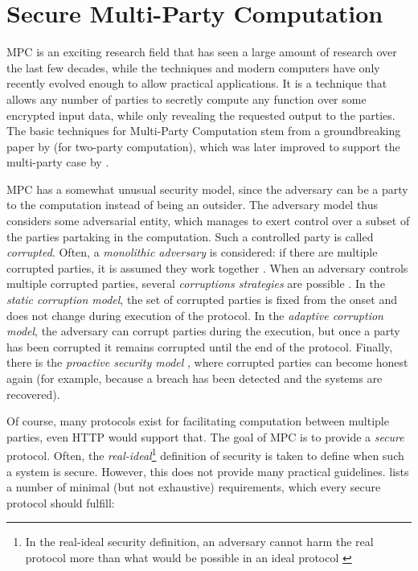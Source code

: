 \section{Secure Multi-Party Computation}
\label{sec:mpc}
\gls{MPC} is an exciting research field that has seen a large amount of research over the last few decades, while the techniques and modern computers have only recently evolved enough to allow practical applications. It is a technique that allows any number of parties to secretly compute any function over some encrypted input data, while only revealing the requested output to the parties. The basic techniques for Multi-Party Computation stem from a groundbreaking paper by \citet{yao} (for two-party computation), which was later improved to support the multi-party case by \citet{mpc}.

\gls{MPC} has a somewhat unusual security model, since the adversary can be a party to the computation instead of being an outsider. The adversary model thus considers some adversarial entity, which manages to exert control over a subset of the parties partaking in the computation. Such a controlled party is called \textit{corrupted}. Often, a \textit{monolithic adversary} is considered: if there are multiple corrupted parties, it is assumed they work together \citep{mpc-good-practice}. When an adversary controls multiple corrupted parties, several \textit{corruptions strategies} are possible \citep{secure-mpc}. In the \textit{static corruption model}, the set of corrupted parties is fixed from the onset and does not change during execution of the protocol. In the \textit{adaptive corruption model}, the adversary can corrupt parties during the execution, but once a party has been corrupted it remains corrupted until the end of the protocol. Finally, there is the \textit{proactive security model} \citep{sec-transient-failures}, where corrupted parties can become honest again (for example, because a breach has been detected and the systems are recovered).

Of course, many protocols exist for facilitating computation between multiple parties, even HTTP would support that. The goal of \gls{MPC} is to provide a \textit{secure} protocol. Often, the \textit{real-ideal}\footnote{In the real-ideal security definition, an adversary cannot harm the real protocol more than what would be possible in an ideal protocol \citep{mpc}} definition of security is taken to define when such a system is secure. However, this does not provide many practical guidelines. \citet{secure-mpc} lists a number of minimal (but not exhaustive) requirements, which every secure protocol should fulfill:

